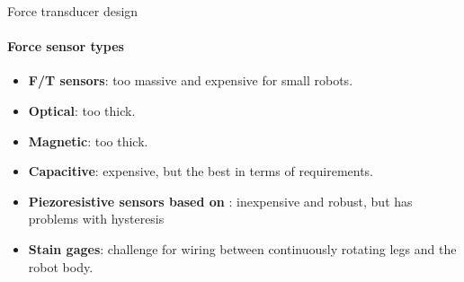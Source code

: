\documentclass[aspectratio=169]{beamer}
\begin{document}
\begin{frame}[t]{Force transducer design}
    \framesubtitle{Force sensor types}
    \vspace{-20pt}
    \begin{multicols}{2}
        \begin{itemize}
            \item  \textbf{F/T sensors}: too massive and expensive for small robots.
            \item \textbf{Optical}: too thick.
            \item \textbf{Magnetic}: too thick.
            \item \textbf{Capacitive}: expensive, but the best in terms of requirements.
            \item {\color{black}\textbf{Piezoresistive sensors
                      based on }: inexpensive and robust, but has problems with hysteresis}

            \item {  \textbf{Stain gages}: challenge for wiring between continuously rotating legs and the robot body.}
        \end{itemize}
    \end{multicols}
    \vspace{-10pt}
\end{frame}
\end{document}
